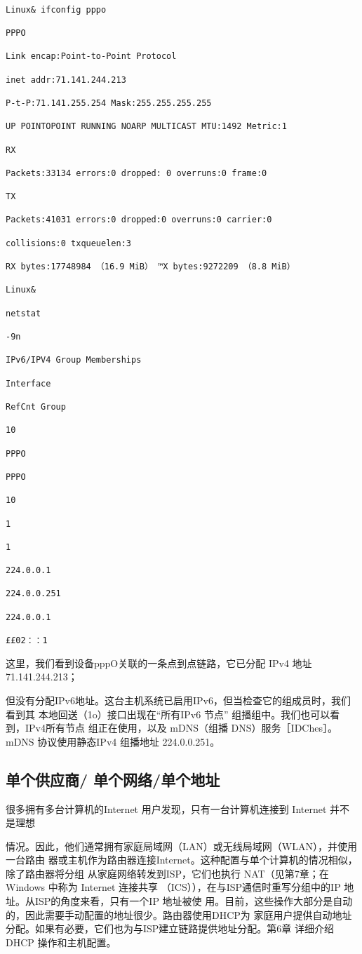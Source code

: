 \begin{verbatim}
    
Linux& ifconfig pppo

PPPO

Link encap:Point-to-Point Protocol

inet addr:71.141.244.213

P-t-P:71.141.255.254 Mask:255.255.255.255

UP POINTOPOINT RUNNING NOARP MULTICAST MTU:1492 Metric:1

RX

Packets:33134 errors:0 dropped: 0 overruns:0 frame:0

TX

Packets:41031 errors:0 dropped:0 overruns:0 carrier:0

collisions:0 txqueuelen:3

RX bytes:17748984 （16.9 MiB） ™X bytes:9272209 （8.8 MiB）

Linux&

netstat

-9n

IPv6/IPV4 Group Memberships

Interface

RefCnt Group

10

PPPO

PPPO

10

1

1

224.0.0.1

224.0.0.251

224.0.0.1

££02：：1
\end{verbatim}

这里，我们看到设备pppO关联的一条点到点链路，它已分配 IPv4 地址 71.141.244.213；

但没有分配IPv6地址。这台主机系统已启用IPv6，但当检查它的组成员时，我们看到其
本地回送（1o）接口出现在“所有IPv6 节点” 组播组中。我们也可以看到，IPv4所有节点
组正在使用，以及 mDNS（组播 DNS）服务［IDChes］。mDNS 协议使用静态IPv4 组播地址
224.0.0.251。

\subsection{单个供应商/ 单个网络/单个地址}
很多拥有多台计算机的Internet 用户发现，只有一台计算机连接到 Internet 并不是理想

情况。因此，他们通常拥有家庭局域网（LAN）或无线局域网（WLAN），并使用一台路由
器或主机作为路由器连接Internet。这种配置与单个计算机的情况相似，除了路由器将分组
从家庭网络转发到ISP，它们也执行 NAT（见第7章；在 Windows 中称为 Internet 连接共享
（ICS）），在与ISP通信时重写分组中的IP 地址。从ISP的角度来看，只有一个IP 地址被使
用。目前，这些操作大部分是自动的，因此需要手动配置的地址很少。路由器使用DHCP为
家庭用户提供自动地址分配。如果有必要，它们也为与ISP建立链路提供地址分配。第6章
详细介绍 DHCP 操作和主机配置。

